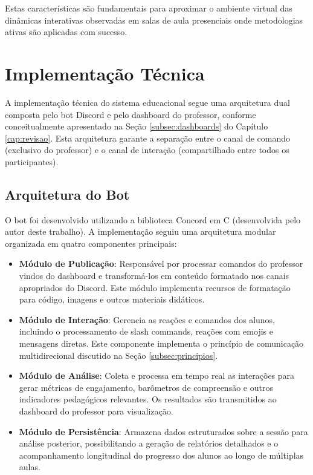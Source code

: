 Estas características são fundamentais para aproximar o ambiente virtual das dinâmicas interativas observadas em salas de aula presenciais onde metodologias ativas são aplicadas com sucesso.


\section{Implementação Técnica}
\label{sec:implementacao}

A implementação técnica do sistema educacional segue uma arquitetura dual composta pelo bot Discord e pelo dashboard do professor, conforme conceitualmente apresentado na Seção \ref{subsec:dashboards} do Capítulo \ref{cap:revisao}. Esta arquitetura garante a separação entre o canal de comando (exclusivo do professor) e o canal de interação (compartilhado entre todos os participantes).

\subsection{Arquitetura do Bot}

O bot foi desenvolvido utilizando a biblioteca Concord em C (desenvolvida pelo autor deste trabalho). A implementação seguiu uma arquitetura modular organizada em quatro componentes principais:

\begin{itemize}
\item \textbf{Módulo de Publicação}: Responsável por processar comandos do professor vindos do dashboard e transformá-los em conteúdo formatado nos canais apropriados do Discord. Este módulo implementa recursos de formatação para código, imagens e outros materiais didáticos.
\item \textbf{Módulo de Interação}: Gerencia as reações e comandos dos alunos, incluindo o processamento de slash commands, reações com emojis e mensagens diretas. Este componente implementa o princípio de comunicação multidirecional discutido na Seção \ref{subsec:principios}.
\item \textbf{Módulo de Análise}: Coleta e processa em tempo real as interações para gerar métricas de engajamento, barômetros de compreensão e outros indicadores pedagógicos relevantes. Os resultados são transmitidos ao dashboard do professor para visualização.
\item \textbf{Módulo de Persistência}: Armazena dados estruturados sobre a sessão para análise posterior, possibilitando a geração de relatórios detalhados e o acompanhamento longitudinal do progresso dos alunos ao longo de múltiplas aulas.
\end{itemize}


